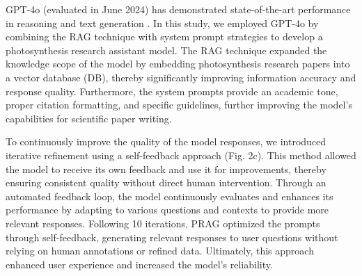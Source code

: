 \documentclass[12pt]{article}
\begin{document}
GPT-4o (evaluated in June 2024) has demonstrated state-of-the-art performance in reasoning and text generation \cite{ref19}. In this study, we employed GPT-4o by combining the RAG technique with system prompt strategies to develop a photosynthesis research assistant model. The RAG technique expanded the knowledge scope of the model by embedding photosynthesis research papers into a vector database (DB), thereby significantly improving information accuracy and response quality. Furthermore, the system prompts provide an academic tone, proper citation formatting, and specific guidelines, further improving the model's capabilities for scientific paper writing.

To continuously improve the quality of the model responses, we introduced iterative refinement using a self-feedback approach (Fig. 2c). This method allowed the model to receive its own feedback and use it for improvements, thereby ensuring consistent quality without direct human intervention. Through an automated feedback loop, the model continuously evaluates and enhances its performance by adapting to various questions and contexts to provide more relevant responses. Following 10 iterations, PRAG optimized the prompts through self-feedback, generating relevant responses to user questions without relying on human annotations or refined data. Ultimately, this approach enhanced user experience and increased the model's reliability.
\end{document}
